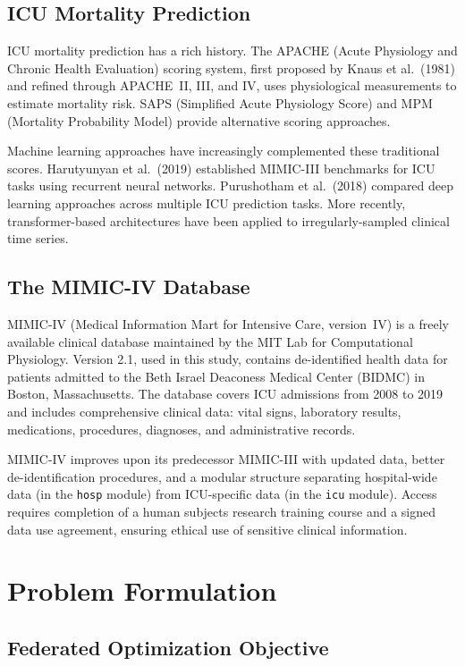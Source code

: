 \documentclass[11pt,a4paper]{report}
\begin{document}
\section{ICU Mortality Prediction}

ICU mortality prediction has a rich history. The APACHE (Acute Physiology and Chronic Health Evaluation) scoring system, first proposed by Knaus et al.\ (1981) and refined through APACHE~II, III, and IV, uses physiological measurements to estimate mortality risk. SAPS (Simplified Acute Physiology Score) and MPM (Mortality Probability Model) provide alternative scoring approaches.

Machine learning approaches have increasingly complemented these traditional scores. Harutyunyan et al.\ (2019) established MIMIC-III benchmarks for ICU tasks using recurrent neural networks. Purushotham et al.\ (2018) compared deep learning approaches across multiple ICU prediction tasks. More recently, transformer-based architectures have been applied to irregularly-sampled clinical time series.

\section{The MIMIC-IV Database}

MIMIC-IV (Medical Information Mart for Intensive Care, version~IV) is a freely available clinical database maintained by the MIT Lab for Computational Physiology. Version 2.1, used in this study, contains de-identified health data for patients admitted to the Beth Israel Deaconess Medical Center (BIDMC) in Boston, Massachusetts. The database covers ICU admissions from 2008 to 2019 and includes comprehensive clinical data: vital signs, laboratory results, medications, procedures, diagnoses, and administrative records.

MIMIC-IV improves upon its predecessor MIMIC-III with updated data, better de-identification procedures, and a modular structure separating hospital-wide data (in the \texttt{hosp} module) from ICU-specific data (in the \texttt{icu} module). Access requires completion of a human subjects research training course and a signed data use agreement, ensuring ethical use of sensitive clinical information.


\chapter{Problem Formulation}

\section{Federated Optimization Objective}
\end{document}
